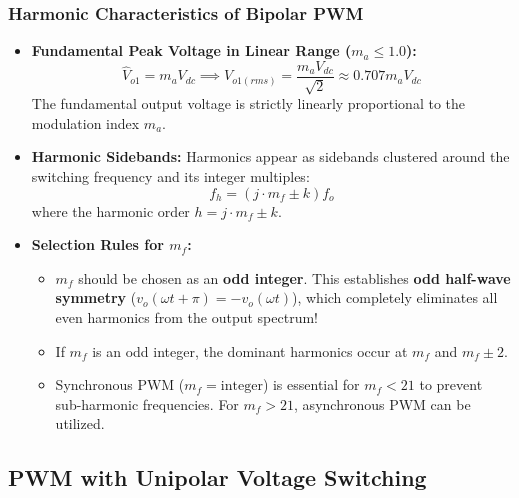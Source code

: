 \documentclass[11pt,a4paper]{article}
\begin{document}
\subsubsection{Harmonic Characteristics of Bipolar PWM}
\begin{itemize}[leftmargin=*]
  \item \textbf{Fundamental Peak Voltage in Linear Range ($m_a \le 1.0$):}
  \begin{equation}
  \hat{V}_{o1} = m_a V_{dc} \implies V_{o1(rms)} = \frac{m_a V_{dc}}{\sqrt{2}} \approx 0.707 m_a V_{dc}
  \end{equation}
  The fundamental output voltage is strictly linearly proportional to the modulation index $m_a$.
  \item \textbf{Harmonic Sidebands:} Harmonics appear as sidebands clustered around the switching frequency and its integer multiples:
  \begin{equation}
  f_h = \left(j \cdot m_f \pm k\right) f_o
  \end{equation}
  where the harmonic order $h = j \cdot m_f \pm k$.
  \item \textbf{Selection Rules for $m_f$:}
  \begin{itemize}
    \item $m_f$ should be chosen as an \textbf{odd integer}. This establishes \textbf{odd half-wave symmetry} ($v_o(\omega t + \pi) = -v_o(\omega t)$), which completely eliminates all even harmonics from the output spectrum!
    \item If $m_f$ is an odd integer, the dominant harmonics occur at $m_f$ and $m_f \pm 2$.
    \item Synchronous PWM ($m_f = \text{integer}$) is essential for $m_f < 21$ to prevent sub-harmonic frequencies. For $m_f > 21$, asynchronous PWM can be utilized.
  \end{itemize}
\end{itemize}

\subsection{PWM with Unipolar Voltage Switching}
\end{document}
